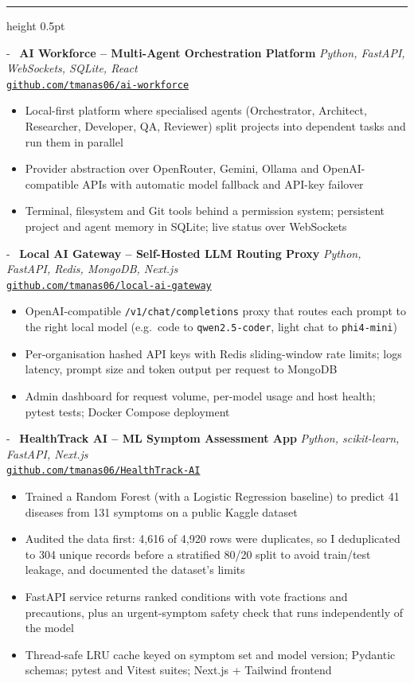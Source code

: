 \documentclass[11pt,a4paper]{article}
\makeatletter
\newcommand{\needspace}[1]{\par\penalty-100\begingroup\setlength{\dimen@}{#1}%
  \dimen@ii\pagegoal\advance\dimen@ii-\pagetotal
  \ifdim\dimen@>\dimen@ii\ifdim\dimen@ii>\z@\vfil\fi\break\fi\endgroup}
\newcommand{\cvsection}[1]{%
  \vspace{6pt}%
  \noindent{\large\textbf{\MakeUppercase{#1}}}%
  \vspace{2pt}%
  \hrule height 0.5pt%
  \vspace{4pt}%
}
\newcommand{\projectentry}[4]{%
  \par\needspace{4\baselineskip}\noindent
  \faGithub\ \textbf{#1} \hfill \textit{#2} \\
  {\small\texttt{#3}}
  \begin{itemize}[leftmargin=1.5em, itemsep=0.5pt, parsep=0pt, topsep=1pt]
    #4
  \end{itemize}
  \vspace{2pt}
}
\makeatother
\begin{document}
\cvsection{AI Projects}

\projectentry{AI Workforce -- Multi-Agent Orchestration Platform}%
  {Python, FastAPI, WebSockets, SQLite, React}%
  {\href{https://github.com/tmanas06/ai-workforce}{github.com/tmanas06/ai-workforce}}%
  {\item Local-first platform where specialised agents (Orchestrator, Architect, Researcher, Developer, QA, Reviewer) split projects into dependent tasks and run them in parallel
   \item Provider abstraction over OpenRouter, Gemini, Ollama and OpenAI-compatible APIs with automatic model fallback and API-key failover
   \item Terminal, filesystem and Git tools behind a permission system; persistent project and agent memory in SQLite; live status over WebSockets}

\projectentry{Local AI Gateway -- Self-Hosted LLM Routing Proxy}%
  {Python, FastAPI, Redis, MongoDB, Next.js}%
  {\href{https://github.com/tmanas06/local-ai-gateway}{github.com/tmanas06/local-ai-gateway}}%
  {\item OpenAI-compatible \texttt{/v1/chat/completions} proxy that routes each prompt to the right local model (e.g.\ code to \texttt{qwen2.5-coder}, light chat to \texttt{phi4-mini})
   \item Per-organisation hashed API keys with Redis sliding-window rate limits; logs latency, prompt size and token output per request to MongoDB
   \item Admin dashboard for request volume, per-model usage and host health; pytest tests; Docker Compose deployment}

\projectentry{HealthTrack AI -- ML Symptom Assessment App}%
  {Python, scikit-learn, FastAPI, Next.js}%
  {\href{https://github.com/tmanas06/HealthTrack-AI}{github.com/tmanas06/HealthTrack-AI}}%
  {\item Trained a Random Forest (with a Logistic Regression baseline) to predict 41 diseases from 131 symptoms on a public Kaggle dataset
   \item Audited the data first: 4,616 of 4,920 rows were duplicates, so I deduplicated to 304 unique records before a stratified 80/20 split to avoid train/test leakage, and documented the dataset's limits
   \item FastAPI service returns ranked conditions with vote fractions and precautions, plus an urgent-symptom safety check that runs independently of the model
   \item Thread-safe LRU cache keyed on symptom set and model version; Pydantic schemas; pytest and Vitest suites; Next.js + Tailwind frontend}
\end{document}
